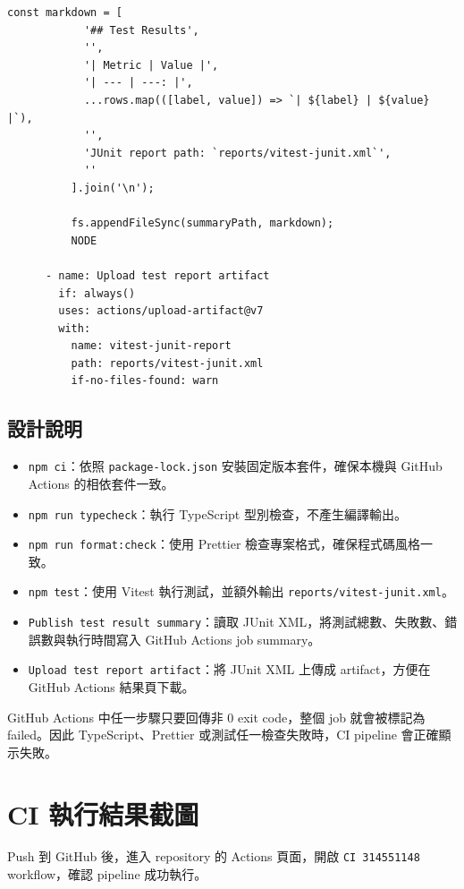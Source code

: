 \documentclass[12pt,a4paper]{article}
\begin{document}
\begin{lstlisting}[style=yamlstyle,language={}]
          const markdown = [
            '## Test Results',
            '',
            '| Metric | Value |',
            '| --- | ---: |',
            ...rows.map(([label, value]) => `| ${label} | ${value} |`),
            '',
            'JUnit report path: `reports/vitest-junit.xml`',
            ''
          ].join('\n');

          fs.appendFileSync(summaryPath, markdown);
          NODE

      - name: Upload test report artifact
        if: always()
        uses: actions/upload-artifact@v7
        with:
          name: vitest-junit-report
          path: reports/vitest-junit.xml
          if-no-files-found: warn
\end{lstlisting}

\subsection{設計說明}

\begin{itemize}
  \item \texttt{npm ci}：依照 \texttt{package-lock.json} 安裝固定版本套件，確保本機與 GitHub Actions 的相依套件一致。
  \item \texttt{npm run typecheck}：執行 TypeScript 型別檢查，不產生編譯輸出。
  \item \texttt{npm run format:check}：使用 Prettier 檢查專案格式，確保程式碼風格一致。
  \item \texttt{npm test}：使用 Vitest 執行測試，並額外輸出 \texttt{reports/vitest-junit.xml}。
  \item \texttt{Publish test result summary}：讀取 JUnit XML，將測試總數、失敗數、錯誤數與執行時間寫入 GitHub Actions job summary。
  \item \texttt{Upload test report artifact}：將 JUnit XML 上傳成 artifact，方便在 GitHub Actions 結果頁下載。
\end{itemize}

GitHub Actions 中任一步驟只要回傳非 0 exit code，整個 job 就會被標記為 failed。因此 TypeScript、Prettier 或測試任一檢查失敗時，CI pipeline 會正確顯示失敗。

\section{CI 執行結果截圖}

Push 到 GitHub 後，進入 repository 的 Actions 頁面，開啟 \texttt{CI 314551148} workflow，確認 pipeline 成功執行。
\end{document}
